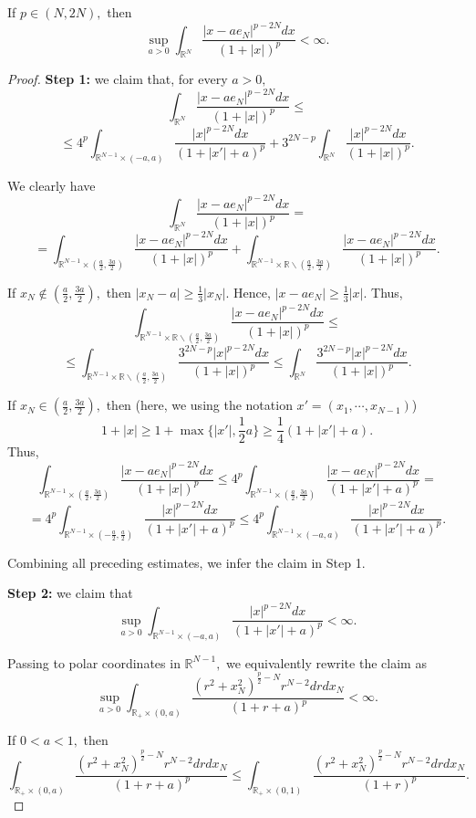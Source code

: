 \documentclass{amsart}
\numberwithin{equation}{section}
\begin{document}
\begin{lemma}\label{s4 second compute lemma} If $p\in(N,2N),$ then
$$\sup_{a>0}\int_{\mathbb{R}^N}\frac{|x-ae_N|^{p-2N}dx}{(1+|x|)^p}<\infty.$$
\end{lemma}
\begin{proof} {\bf Step 1:} we claim that, for every $a>0,$
$$\int_{\mathbb{R}^N}\frac{|x-ae_N|^{p-2N}dx}{(1+|x|)^p}\leq$$
$$\leq 4^p\int_{\mathbb{R}^{N-1}\times(-a,a)}\frac{|x|^{p-2N}dx}{(1+|x'|+a)^p}+3^{2N-p}\int_{\mathbb{R}^N}\frac{|x|^{p-2N}dx}{(1+|x|)^p}.$$


We clearly have
$$\int_{\mathbb{R}^N}\frac{|x-ae_N|^{p-2N}dx}{(1+|x|)^p}=$$
$$=\int_{\mathbb{R}^{N-1}\times(\frac{a}{2},\frac{3a}{2})}\frac{|x-ae_N|^{p-2N}dx}{(1+|x|)^p}+\int_{\mathbb{R}^{N-1}\times\mathbb{R}\backslash(\frac{a}{2},\frac{3a}{2})}\frac{|x-ae_N|^{p-2N}dx}{(1+|x|)^p}.$$

If $x_N\notin(\frac{a}{2},\frac{3a}{2}),$ then $|x_N-a|\geq \frac13|x_N|.$ Hence, $|x-ae_N|\geq \frac13|x|.$ Thus,
$$\int_{\mathbb{R}^{N-1}\times\mathbb{R}\backslash(\frac{a}{2},\frac{3a}{2})}\frac{|x-ae_N|^{p-2N}dx}{(1+|x|)^p}\leq$$
$$\leq \int_{\mathbb{R}^{N-1}\times\mathbb{R}\backslash(\frac{a}{2},\frac{3a}{2})}\frac{3^{2N-p}|x|^{p-2N}dx}{(1+|x|)^p}\leq \int_{\mathbb{R}^N}\frac{3^{2N-p}|x|^{p-2N}dx}{(1+|x|)^p}.$$

If $x_N\in(\frac{a}{2},\frac{3a}{2}),$ then (here, we using the notation $x'=(x_1,\cdots,x_{N-1})$) $$1+|x|\geq1+\max\{|x'|,\frac12a\}\geq\frac14(1+|x'|+a).$$
Thus,
$$\int_{\mathbb{R}^{N-1}\times(\frac{a}{2},\frac{3a}{2})}\frac{|x-ae_N|^{p-2N}dx}{(1+|x|)^p}\leq 4^p\int_{\mathbb{R}^{N-1}\times(\frac{a}{2},\frac{3a}{2})}\frac{|x-ae_N|^{p-2N}dx}{(1+|x'|+a)^p}=$$
$$=4^p\int_{\mathbb{R}^{N-1}\times(-\frac{a}{2},\frac{a}{2})}\frac{|x|^{p-2N}dx}{(1+|x'|+a)^p}\leq 4^p\int_{\mathbb{R}^{N-1}\times(-a,a)}\frac{|x|^{p-2N}dx}{(1+|x'|+a)^p}.$$

Combining all preceding estimates, we infer the claim in Step 1.

{\bf Step 2:} we claim that
$$\sup_{a>0}\int_{\mathbb{R}^{N-1}\times(-a,a)}\frac{|x|^{p-2N}dx}{(1+|x'|+a)^p}<\infty.$$

Passing to polar coordinates in $\mathbb{R}^{N-1},$ we equivalently rewrite the claim as
$$\sup_{a>0}\int_{\mathbb{R}_+\times(0,a)}\frac{(r^2+x_N^2)^{\frac{p}{2}-N}r^{N-2}drdx_N}{(1+r+a)^p}<\infty.$$

If $0<a<1,$ then
$$\int_{\mathbb{R}_+\times(0,a)}\frac{(r^2+x_N^2)^{\frac{p}{2}-N}r^{N-2}drdx_N}{(1+r+a)^p}\leq \int_{\mathbb{R}_+\times(0,1)}\frac{(r^2+x_N^2)^{\frac{p}{2}-N}r^{N-2}drdx_N}{(1+r)^p}.$$


\end{proof}
\end{document}
